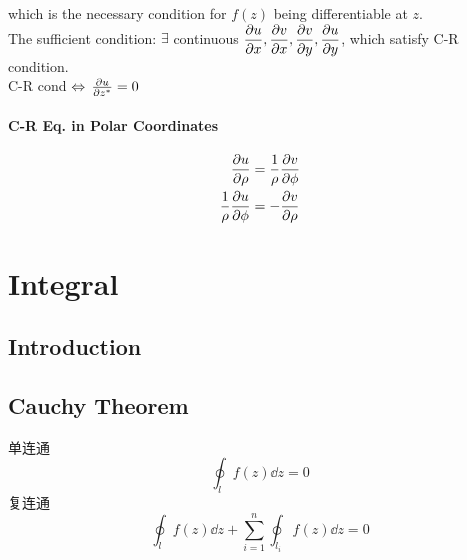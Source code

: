 \documentclass[UTF8]{ctexart} %
\DeclareMathOperator{\dlra}{\Leftrightarrow}
\newcommand{\dis}{\displaystyle}
\numberwithin{equation}{section}
\begin{document}
which is the necessary condition for $f(z)$ being differentiable at $z$.\\
The sufficient condition: $\exists$ continuous $\dis\pdv{u}{x},\dis\pdv{v}{x},\dis\pdv{v}{y},\dis\pdv{u}{y}$, which satisfy C-R condition. \\
C-R cond $\dlra\; \pdv{u}{z^*}=0$\\
\paragraph{C-R Eq. in Polar Coordinates}
\begin{equation}\label{key}
\begin{aligned}
\pdv{u}{\rho} &= \dfrac{1}{\rho}\pdv{v}{\phi}\\
\dfrac{1}{\rho}\pdv{u}{\phi} &= -\pdv{v}{\rho}
\end{aligned}
\end{equation}
\section{Integral}
\subsection{Introduction}

\subsection{Cauchy Theorem}
单连通
\begin{equation}\label{key}
\oint_l f(z)\dd z=0
\end{equation}
复连通
\begin{equation}\label{key}
\oint_l f(z)\dd z + \sum_{i=1}^n\oint_{l_i}f(z)\dd z=0
\end{equation}
\end{document}
